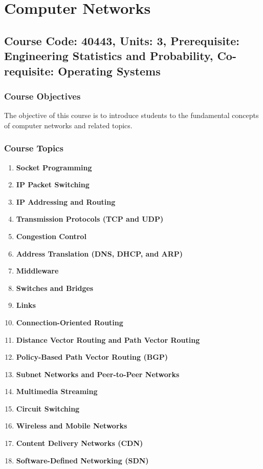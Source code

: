 \documentclass[12pt]{article}
\begin{document}
\newpage

\section{Computer Networks}
\subsection*{Course Code: 40443, Units: 3, Prerequisite: Engineering Statistics and Probability, Co-requisite: Operating Systems}

\subsubsection*{Course Objectives}
The objective of this course is to introduce students to the fundamental concepts of computer networks and related topics.

\subsubsection*{Course Topics}
\begin{enumerate}
    \item \textbf{Socket Programming}
    \item \textbf{IP Packet Switching}
    \item \textbf{IP Addressing and Routing}
    \item \textbf{Transmission Protocols (TCP and UDP)}
    \item \textbf{Congestion Control}
    \item \textbf{Address Translation (DNS, DHCP, and ARP)}
    \item \textbf{Middleware}
    \item \textbf{Switches and Bridges}
    \item \textbf{Links}
    \item \textbf{Connection-Oriented Routing}
    \item \textbf{Distance Vector Routing and Path Vector Routing}
    \item \textbf{Policy-Based Path Vector Routing (BGP)}
    \item \textbf{Subnet Networks and Peer-to-Peer Networks}
    \item \textbf{Multimedia Streaming}
    \item \textbf{Circuit Switching}
    \item \textbf{Wireless and Mobile Networks}
    \item \textbf{Content Delivery Networks (CDN)}
    \item \textbf{Software-Defined Networking (SDN)}
\end{enumerate}
\end{document}

